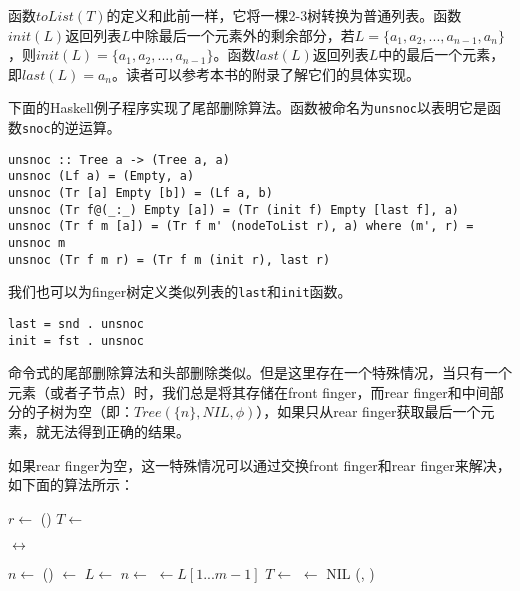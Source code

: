\documentclass[UTF8]{article}
\begin{document}
函数$toList(T)$的定义和此前一样，它将一棵2-3树转换为普通列表。函数$init(L)$返回列表$L$中除最后一个元素外的剩余部分，若$L = \{a_1, a_2, ..., a_{n-1}, a_n\}$，则$init(L) = \{a_1, a_2, ..., a_{n-1}\}$。函数$last(L)$返回列表$L$中的最后一个元素，即$last(L) = a_n$。读者可以参考本书的附录了解它们的具体实现。

下面的Haskell例子程序实现了尾部删除算法。函数被命名为\texttt{unsnoc}以表明它是函数\texttt{snoc}的逆运算。

\lstset{language=Haskell}
\begin{lstlisting}
unsnoc :: Tree a -> (Tree a, a)
unsnoc (Lf a) = (Empty, a)
unsnoc (Tr [a] Empty [b]) = (Lf a, b)
unsnoc (Tr f@(_:_) Empty [a]) = (Tr (init f) Empty [last f], a)
unsnoc (Tr f m [a]) = (Tr f m' (nodeToList r), a) where (m', r) = unsnoc m
unsnoc (Tr f m r) = (Tr f m (init r), last r)
\end{lstlisting}

我们也可以为finger树定义类似列表的\texttt{last}和\texttt{init}函数。

\begin{lstlisting}
last = snd . unsnoc
init = fst . unsnoc
\end{lstlisting}

命令式的尾部删除算法和头部删除类似。但是这里存在一个特殊情况，当只有一个元素（或者子节点）时，我们总是将其存储在front finger，而rear finger和中间部分的子树为空（即：$Tree(\{n\}, NIL, \phi)$），如果只从rear finger获取最后一个元素，就无法得到正确的结果。

如果rear finger为空，这一特殊情况可以通过交换front finger和rear finger来解决，如下面的算法所示：

\begin{algorithmic}
  \State $r \gets$ ()
  \State {}
    \State $T \gets$ 
  \EndWhile

    \State {}  $\leftrightarrow$ 
  \EndIf

  \State $n \gets $ ()
  \State {} $\gets$ 
  \Repeat
    \State $L \gets$  
    \State $n \gets$  
    \State {} $\gets L[1...m-1]$ 
    \State $T \gets $ 
      \State {} $\gets$ NIL
    \EndIf
  \State \Return (, )
\EndFunction
\end{algorithmic}
\end{document}

